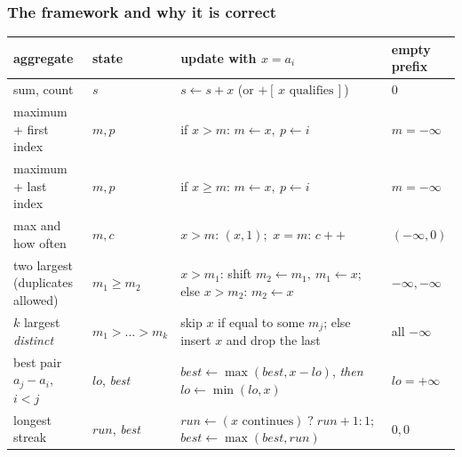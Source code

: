 \subsubsection*{The framework and why it is correct}

\begin{table}[H]
\centering\small
\renewcommand{\arraystretch}{1.25}
\begin{tabularx}{\linewidth}{@{}>{\raggedright\arraybackslash}p{3.1cm} >{\raggedright\arraybackslash}p{2.6cm} >{\raggedright\arraybackslash}X >{\raggedright\arraybackslash}p{2.4cm}@{}}
\toprule
\textbf{aggregate} & \textbf{state} & \textbf{update with $x = a_i$} & \textbf{empty prefix} \\
\midrule
sum, count & $s$ & $s \gets s + x$ (or $+[\,x \text{ qualifies}\,]$) & $0$ \\
maximum + first index & $m, p$ & if $x > m$: $m \gets x,\ p \gets i$ & $m = -\infty$ \\
maximum + last index & $m, p$ & if $x \ge m$: $m \gets x,\ p \gets i$ & $m = -\infty$ \\
max and how often & $m, c$ & $x > m$: $(x, 1)$;\ $x = m$: $c{+}{+}$ & $(-\infty, 0)$ \\
two largest (duplicates allowed) & $m_1 \ge m_2$ & $x > m_1$: shift $m_2 \gets m_1,\ m_1 \gets x$; else $x > m_2$: $m_2 \gets x$ & $-\infty, -\infty$ \\
$k$ largest \emph{distinct} & $m_1 > \dots > m_k$ & skip $x$ if equal to some $m_j$; else insert $x$ and drop the last & all $-\infty$ \\
best pair $a_j - a_i$, $i < j$ & $\mathit{lo}$, \textit{best} & $\mathit{best} \gets \max(\mathit{best}, x - \mathit{lo})$, \emph{then} $\mathit{lo} \gets \min(\mathit{lo}, x)$ & $\mathit{lo} = +\infty$ \\
longest streak & $\mathit{run}$, \textit{best} & $\mathit{run} \gets (x \text{ continues}) \;?\; \mathit{run}+1 : 1$; $\mathit{best} \gets \max(\mathit{best}, \mathit{run})$ & $0, 0$ \\
\bottomrule
\end{tabularx}
\end{table}

